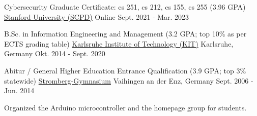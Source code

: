 

\begin{cventries}

  \cventry
    {Cybersecurity Graduate Certificate: cs 251, cs 212, cs 155, cs 255 (3.96 GPA)}
    {\href{https://online.stanford.edu/programs/cybersecurity-graduate-program}{Stanford University (SCPD)} }
    {Online}
    {Sept. 2021 - Mar. 2023}
    {}

  \cventry
    {B.Sc. in Information Engineering and Management (3.2 GPA; top 10\% as per ECTS grading table)} %
    {\href{https://www.sle.kit.edu/english/vorstudium/bachelor-information-engineering-management.php}{Karlsruhe Institute of Technology (KIT)} } %
    {Karlsruhe, Germany} %
    {Okt. 2014 - Sept. 2020} %
    {}
  
  \cventry
    {Abitur / General Higher Education Entrance Qualification  (3.9 GPA; top 3\% statewide)} %
    {\href{https://www.stromberg-gymnasium.de/?page_id=113}{Stromberg-Gymnasium}} %
    {Vaihingen an der Enz, Germany} %
    {Sept. 2006 - Jun. 2014} %
    {
      \begin{cvitems} %
        \item {Organized the Arduino microcontroller and the homepage group for students.}
      \end{cvitems}
    }

\end{cventries}
